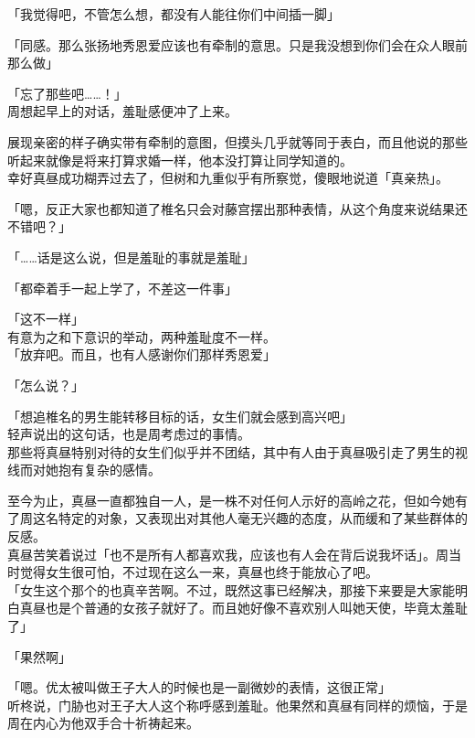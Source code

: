「我觉得吧，不管怎么想，都没有人能往你们中间插一脚」

「同感。那么张扬地秀恩爱应该也有牵制的意思。只是我没想到你们会在众人眼前那么做」

「忘了那些吧……！」\\

周想起早上的对话，羞耻感便冲了上来。

展现亲密的样子确实带有牵制的意图，但摸头几乎就等同于表白，而且他说的那些听起来就像是将来打算求婚一样，他本没打算让同学知道的。\\

幸好真昼成功糊弄过去了，但树和九重似乎有所察觉，傻眼地说道「真亲热」。

「嗯，反正大家也都知道了椎名只会对藤宫摆出那种表情，从这个角度来说结果还不错吧？」

「……话是这么说，但是羞耻的事就是羞耻」

「都牵着手一起上学了，不差这一件事」

「这不一样」\\

有意为之和下意识的举动，两种羞耻度不一样。\\

「放弃吧。而且，也有人感谢你们那样秀恩爱」

「怎么说？」

「想追椎名的男生能转移目标的话，女生们就会感到高兴吧」\\

轻声说出的这句话，也是周考虑过的事情。\\

那些将真昼特别对待的女生们似乎并不团结，其中有人由于真昼吸引走了男生的视线而对她抱有复杂的感情。

至今为止，真昼一直都独自一人，是一株不对任何人示好的高岭之花，但如今她有了周这名特定的对象，又表现出对其他人毫无兴趣的态度，从而缓和了某些群体的反感。\\

真昼苦笑着说过「也不是所有人都喜欢我，应该也有人会在背后说我坏话」。周当时觉得女生很可怕，不过现在这么一来，真昼也终于能放心了吧。\\

「女生这个那个的也真辛苦啊。不过，既然这事已经解决，那接下来要是大家能明白真昼也是个普通的女孩子就好了。而且她好像不喜欢别人叫她天使，毕竟太羞耻了」

「果然啊」

「嗯。优太被叫做王子大人的时候也是一副微妙的表情，这很正常」\\

听柊说，门胁也对王子大人这个称呼感到羞耻。他果然和真昼有同样的烦恼，于是周在内心为他双手合十祈祷起来。\\

